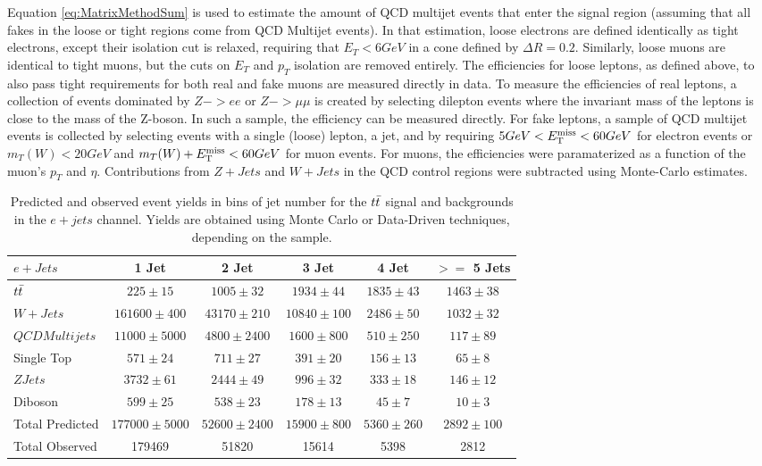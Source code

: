Equation \ref{eq:MatrixMethodSum} is used to estimate the amount of QCD multijet events that enter the signal region (assuming that all fakes in the loose or tight regions come from QCD Multijet events).
In that estimation, loose electrons are defined identically as tight electrons, except their isolation cut is relaxed, requiring that $E_{T} < 6 GeV$ in a cone defined by $\Delta R = 0.2$.
Similarly, loose muons are identical to tight muons, but the cuts on $E_{T}$ and $p_{T}$ isolation are removed entirely.
The efficiencies for loose leptons, as defined above, to also pass tight requirements for both real and fake muons are measured directly in data.
To measure the efficiencies of real leptons, a collection of events dominated by $Z->ee$ or $Z->\mu\mu$ is created by selecting dilepton events where the invariant mass of the leptons is close to the mass of the Z-boson.
In such a sample, the efficiency can be measured directly.
For fake leptons, a sample of QCD multijet events is collected by selecting events with a single (loose) lepton, a jet, and by requiring $5 GeV < E_{\mathrm{T}}^{\mathrm{miss}} <  60 GeV$ for electron events or $m_{T}(W) < 20 GeV$ and $m_{T}(W) + E_{\mathrm{T}}^{\mathrm{miss}} < 60 GeV$ for muon events.
For muons, the efficiencies were paramaterized as a function of the muon's $p_{T}$ and $\eta$.
Contributions from $Z+Jets$ and $W+Jets$ in the QCD control regions were subtracted using Monte-Carlo estimates.

\begin{table}
  \begin{tabular}{lccccc}
    \hline
    $e + Jets$ & 1 Jet & 2 Jet & 3 Jet & 4 Jet & $>=$ 5 Jets \\ 
    \hline
    $t\bar{t}$ & $225 \pm 15$ & $1005 \pm 32$ & $1934 \pm 44$ & $1835 \pm 43$ & $1463 \pm 38$ \\
    $W+Jets$ & $161600 \pm 400$ & $43170 \pm 210$ & $10840 \pm 100$ & $2486 \pm 50$ & $1032 \pm 32$ \\
    $QCD Multijets$ & $11000 \pm 5000$ & $4800 \pm 2400$ & $1600 \pm 800$ & $510 \pm 250$ & $117 \pm 89$ \\
    Single Top & $571 \pm 24$ & $711 \pm 27$ & $391 \pm 20$ & $156 \pm 13$ & $65 \pm 8$ \\
    $ZJets$ & $3732 \pm 61$ & $2444 \pm 49$ & $996 \pm 32$ & $333 \pm 18$ & $146 \pm 12$ \\
    Diboson & $599 \pm 25$ & $538 \pm 23$ & $178 \pm 13$ & $45 \pm 7$ & $10 \pm 3$ \\
    \hline
    Total Predicted & $177000 \pm 5000$ & $52600 \pm 2400$ & $15900 \pm 800$ & $5360 \pm 260$ & $2892 \pm 100$ \\
    Total Observed & 179469 & 51820 & 15614 & 5398 & 2812 \\
    \hline
  \end{tabular}
  \caption{Predicted and observed event yields in bins of jet number for the $t\bar{t}$ signal and backgrounds in the $e+jets$ channel.  Yields are obtained using Monte Carlo or Data-Driven techniques, depending on the sample.}
\end{table}

